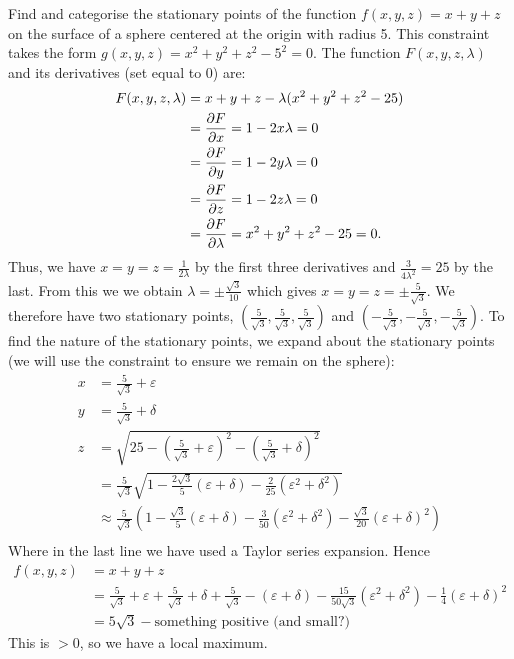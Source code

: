 \documentclass[../multivariate_calculus.tex]{subfiles}
\begin{document}
        \begin{example}
            Find and categorise the stationary points of the function $f(x,y,z)=x+y+z$ on the surface of a sphere centered at the origin with radius 5.
            This constraint takes the form $g(x,y,z)=x^2+y^2+z^2-5^2=0$.
            The function $F(x,y,z,\lambda)$ and its derivatives (set equal to 0) are:
            \begin{align}
                F(x,y,z,\lambda)&=x+y+z-\lambda(x^2+y^2+z^2-25)\\
                &=\pdv{F}{x}=1-2x\lambda=0\\
                &=\pdv{F}{y}=1-2y\lambda=0\\
                &=\pdv{F}{z}=1-2z\lambda=0\\
                &=\pdv{F}{\lambda}=x^2+y^2+z^2-25=0.
            \end{align}
            Thus, we have $x=y=z=\frac{1}{2\lambda}$ by the first three derivatives and $\frac{3}{4\lambda^2}=25$ by the last.
            From this we we obtain $\lambda=\pm\frac{\sqrt{3}}{10}$ which gives $x=y=z=\pm\frac{5}{\sqrt{3}}$.
            We therefore have two stationary points, $(\frac{5}{\sqrt{3}},\frac{5}{\sqrt{3}},\frac{5}{\sqrt{3}})$ and $(-\frac{5}{\sqrt{3}},-\frac{5}{\sqrt{3}},-\frac{5}{\sqrt{3}})$.
            To find the nature of the stationary points, we expand about the stationary points (we will use the constraint to ensure we remain on the sphere):
            \begin{align}
                x&=\frac{5}{\sqrt{3}}+\varepsilon\\
                y&=\frac{5}{\sqrt{3}}+\delta\\
                z&=\sqrt{25-\left(\frac{5}{\sqrt{3}}+\varepsilon\right)^2-\left(\frac{5}{\sqrt{3}}+\delta\right)^2}\\
                &=\frac{5}{\sqrt{3}}\sqrt{1-\frac{2\sqrt{3}}{5}(\varepsilon+\delta)-\frac{2}{25}(\varepsilon^2+\delta^2)}\\
                &\approx\frac{5}{\sqrt{3}}(1-\frac{\sqrt{3}}{5}(\varepsilon+\delta)-\frac{3}{50}(\varepsilon^2+\delta^2)-\frac{\sqrt{3}}{20}(\varepsilon+\delta)^2)\\
            \end{align}
            Where in the last line we have used a Taylor series expansion.
            Hence
            \begin{align}
                f(x,y,z)&=x+y+z\\
                &=\frac{5}{\sqrt{3}}+\varepsilon+\frac{5}{\sqrt{3}}+\delta+\frac{5}{\sqrt{3}}-(\varepsilon+\delta)-\frac{15}{50\sqrt{3}}(\varepsilon^2+\delta^2)-\frac{1}{4}(\varepsilon+\delta)^2\\
                &=5\sqrt{3}-\text{something positive (and small?)}
            \end{align}
            This is $>0$, so we have a local maximum.
        \end{example}
\end{document}
